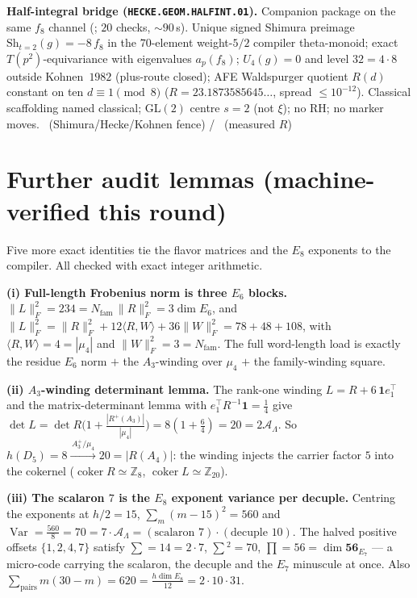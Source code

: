 \documentclass[11pt,a4paper]{article}
\newcommand{\Nfam}{N_{\mathrm{fam}}}
\newcommand{\AL}{\mathcal A_\Lambda}
\newcommand{\Z}{\mathbb{Z}}
\theoremstyle{definition}
\begin{document}
\par\smallskip\noindent\textbf{Half-integral bridge
(\texttt{HECKE.GEOM.HALFINT.01}).}
Companion package on the same $f_8$ channel
(; $20$ checks, $\sim90$\,s). Unique signed Shimura
preimage $\mathrm{Sh}_{t=2}(g)=-8\,f_8$ in the $70$-element weight-$5/2$ compiler
theta-monoid; exact $T(p^2)$-equivariance with eigenvalues $a_p(f_8)$; $U_4(g)=0$ and
level $32=4\cdot8$ outside Kohnen~$1982$ (plus-route closed); AFE Waldspurger quotient
$R(d)$ constant on ten $d\equiv1\pmod8$ ($R=23.1873585645\ldots$, spread $\le10^{-12}$).
Classical scaffolding named classical; GL$(2)$ centre $s=2$ (not $\xi$); no RH; no marker
moves.
\mE\ (Shimura/Hecke/Kohnen fence) / \mC\ (measured $R$)
\par\smallskip

\section{Further audit lemmas (machine-verified this round)}
Five more exact identities tie the flavor matrices and the $E_8$ exponents to the compiler. All checked
with exact integer arithmetic.

\par\smallskip\noindent\textbf{(i) Full-length Frobenius norm is three $E_6$ blocks.}
$\|L\|_F^2=234=\Nfam\,\|R\|_F^2=3\dim E_6$, and
$\|L\|_F^2=\|R\|_F^2+12\langle R,W\rangle+36\|W\|_F^2=78+48+108$,
with $\langle R,W\rangle=4=|\mu_4|$ and $\|W\|_F^2=3=\Nfam$. The full word-length load is exactly the
residue $E_6$ norm $+$ the $A_3$-winding over $\mu_4$ $+$ the family-winding square. \mE

\par\smallskip\noindent\textbf{(ii) $A_3$-winding determinant lemma.}
The rank-one winding $L=R+6\,\mathbf 1 e_1^\top$ and the matrix-determinant lemma with
$e_1^\top R^{-1}\mathbf 1=\tfrac14$ give
$\det L=\det R\bigl(1+\tfrac{|R^+(A_3)|}{|\mu_4|}\bigr)=8(1+\tfrac64)=20=2\AL$.
So $h(D_5)=8\xrightarrow{\,A_3^+/\mu_4\,}20=|R(A_4)|$: the winding injects the carrier factor $5$ into
the cokernel ($\operatorname{coker}R\simeq\Z_8$, $\operatorname{coker}L\simeq\Z_{20}$). \mE

\par\smallskip\noindent\textbf{(iii) The scalaron $7$ is the $E_8$ exponent variance per decuple.}
Centring the exponents at $h/2=15$, $\sum_m(m-15)^2=560$ and
$\operatorname{Var}=\tfrac{560}{8}=70=7\cdot\AL=(\text{scalaron }7)\cdot(\text{decuple }10)$.
The halved positive offsets $\{1,2,4,7\}$ satisfy $\sum=14=2\cdot7$, $\sum{}^2=70$, $\prod=56=\dim\mathbf{56}_{E_7}$
--- a micro-code carrying the scalaron, the decuple and the $E_7$ minuscule at once.
Also $\sum_{\text{pairs}}m(30-m)=620=\tfrac{h\dim E_8}{12}=2\cdot10\cdot31$. \mE
\end{document}

